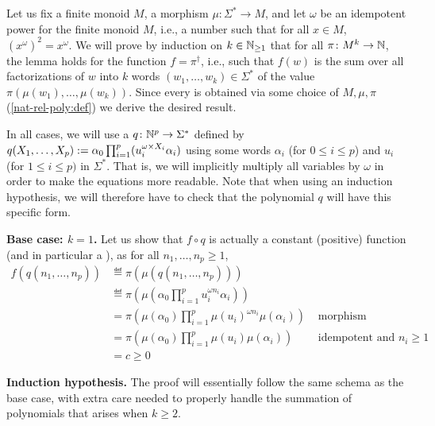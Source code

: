 \begin{proofof}
	Let us fix a finite monoid $M$, a morphism $\mu \colon \Sigma^* \to M$, and
	let $\omega$ be an idempotent power for the finite monoid $M$,
	i.e., a number such that for all $x \in M$,
	$(x^{\omega})^2 = x^{\omega}$.
	We will prove by induction on $k \in \mathbb{N}_{\geq 1}$
	that for all
	$\pi \colon M^k \to \mathbb{N}$,
	the lemma holds for the function
	$f = \pi^\dagger$, i.e., such that
	$f(w)$ is the sum over all factorizations of $w$
	into $k$ words $(w_1, \dots, w_k) \in \Sigma^*$
	of the value $\pi(\mu(w_1), \dots, \mu(w_k))$.
	Since every 
	is obtained via some choice of $M, \mu, \pi$ (\cref{nat-rel-poly:def})
	we derive the desired result.

	In all cases, we will use a  $q \colon \mathbb{N}^p \to
		\Sigma^*$ defined by $q(X_1, \dots, X_p) \mathrel{:=} \alpha_0 \prod_{i = 1}^p
		(u_i^{\omega \times X_i} \alpha_i)$ using some words $\alpha_i$ (for $0 \leq i
		\leq p$) and $u_i$ (for $1 \leq i \leq p)$ in $\Sigma^*$. That is, we will
	implicitly multiply all variables by $\omega$ in order to make the
	equations more readable. Note that when using an induction hypothesis, we
	will therefore have to check that the polynomial $q$ will have this
	specific form.

	\textbf{Base case: $k = 1$.}
	Let us show that $f \circ q$ is
	actually a constant (positive) function (and in particular a ), as for
	all $n_1, \dots, n_p \geq 1$,
	\begin{align*}
		f(q(n_1, \dots, n_p))
		 & \eqdef \pi\left(\mu(q(n_1, \dots, n_p))\right)                                      \\
		 & \eqdef \pi\left(\mu(\alpha_0 \prod_{i = 1}^p u_i^{\omega n_i} \alpha_i)\right)
		\\
		 & = \pi\left(\mu(\alpha_0) \prod_{i = 1}^p \mu(u_i)^{\omega n_i} \mu(\alpha_i)\right)
		 & \text{ morphism }
		\\
		 & = \pi\left(\mu(\alpha_0) \prod_{i = 1}^p \mu(u_i) \mu(\alpha_i)\right)
		 & \text{ idempotent and } n_i \geq 1                                                  \\
		 & = c \geq 0
	\end{align*}

	\textbf{Induction hypothesis.}
	The proof will essentially follow the same schema as the base case,
	with extra care needed to properly handle the summation of polynomials
	that arises when $k \geq 2$.


\end{proofof}
